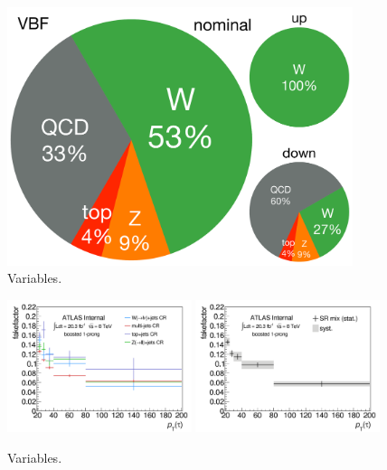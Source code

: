 \begin{figure}[tp]
  \centering
  \includegraphics[width=0.90\textwidth]{figures/backgrounds/rx-vbf}
  \caption{Variables.}
  \label{fig:backgrounds-rx-vbf}
\end{figure}

\begin{figure}[tp]
  \centering
  \includegraphics[width=0.48\textwidth]{figures/backgrounds/fakefactor_8TeV_boosted_1p_CRs}
  \includegraphics[width=0.48\textwidth]{figures/backgrounds/fakefactor_8TeV_boosted_1p_mix}
  \caption{Variables.}
  \label{fig:backgrounds-fakefactorsboost1p}
\end{figure}

